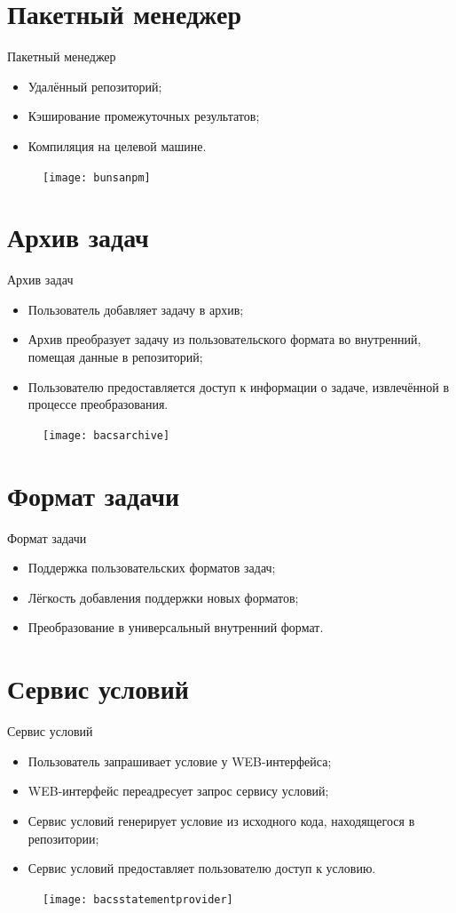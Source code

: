 \documentclass[xetex,mathserif,serif,10pt]{beamer}
\newenvironment{sframe}[2]{\section{#1}\begin{frame}[label=#2]{#1}}{\end{frame}}
\begin{document}
    \begin{sframe}{Пакетный менеджер}{bunsanpm}
        \begin{itemize}
            \item Удалённый репозиторий;
            \item Кэширование промежуточных результатов;
            \item Компиляция на целевой машине.
        \end{itemize}
        \begin{figure}
            \centering
            \texttt{[image: bunsanpm]}
        \end{figure}
    \end{sframe}

    \begin{sframe}{Архив задач}{bacsarchive}
        \begin{itemize}
            \item Пользователь добавляет задачу в архив;
            \item Архив преобразует задачу из пользовательского формата во внутренний,
                помещая данные в репозиторий;
            \item Пользователю предоставляется доступ к информации о задаче,
                извлечённой в процессе преобразования.
        \end{itemize}
        \begin{figure}
            \centering
            \texttt{[image: bacsarchive]}
        \end{figure}
    \end{sframe}

    \begin{sframe}{Формат задачи}{bacsproblem}
        \begin{itemize}
            \item Поддержка пользовательских форматов задач;
            \item Лёгкость добавления поддержки новых форматов;
            \item Преобразование в универсальный внутренний формат.
        \end{itemize}
    \end{sframe}

    \begin{sframe}{Сервис условий}{bacsstatementprovider}
        \begin{itemize}
            \item Пользователь запрашивает условие у WEB-интерфейса;
            \item WEB-интерфейс переадресует запрос сервису условий;
            \item Сервис условий генерирует условие из исходного кода,
                находящегося в репозитории;
            \item Сервис условий предоставляет пользователю доступ к условию.
        \end{itemize}
        \begin{figure}
            \centering
            \texttt{[image: bacsstatementprovider]}
        \end{figure}
    \end{sframe}
\end{document}
